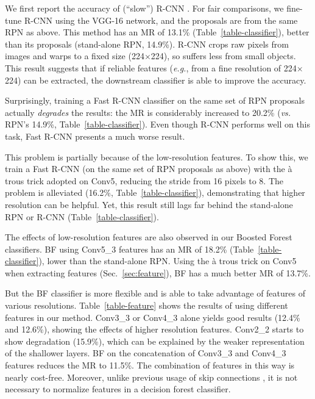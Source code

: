 \documentclass[runningheads]{llncs}
\def\eg{\emph{e.g.}}
\def\vs{\emph{vs. }}
\begin{document}
We first report the accuracy of (``slow'') R-CNN \cite{girshick2014rich}. For fair comparisons, we fine-tune R-CNN using the VGG-16 network, and the proposals are from the same RPN as above. This method has an MR of 13.1\% (Table~\ref{table-classifier}), better than its proposals (stand-alone RPN, 14.9\%). R-CNN crops raw pixels from images and warps to a fixed size (224$\times$224), so suffers less from small objects.
This result suggests that if reliable features (\eg, from a fine resolution of 224$\times$224) can be extracted, the downstream classifier is able to improve the accuracy. 

Surprisingly, training a Fast R-CNN classifier on the same set of RPN proposals actually \textit{degrades} the results: the MR is considerably increased to 20.2\% (\vs RPN's 14.9\%, Table~\ref{table-classifier}). Even though R-CNN performs well on this task, Fast R-CNN presents a much worse result.

This problem is partially because of the low-resolution features. To show this, we train a Fast R-CNN (on the same set of RPN proposals as above) with the \`a trous trick adopted on Conv5, reducing the stride from 16 pixels to 8. The problem is alleviated (16.2\%, Table~\ref{table-classifier}), demonstrating that higher resolution can be helpful. Yet, this result still lags far behind the stand-alone RPN or R-CNN (Table~\ref{table-classifier}).

The effects of low-resolution features are also observed in our Boosted Forest classifiers. BF using Conv5\_3 features has an MR of 18.2\% (Table~\ref{table-classifier}), lower than the stand-alone RPN. Using the \`a trous trick on Conv5 when extracting features (Sec.~\ref{sec:feature}), BF has a much better MR of 13.7\%.

But the BF classifier is more flexible and is able to take advantage of features of various resolutions. Table~\ref{table-feature} shows the results of using different features in our method.
Conv3\_3 or Conv4\_3 alone yields good results (12.4\% and 12.6\%), showing the effects of higher resolution features. Conv2\_2 starts to show degradation (15.9\%), which can be explained by the weaker representation of the shallower layers. 
BF on the concatenation of Conv3\_3 and Conv4\_3 features reduces the MR to 11.5\%. The combination of features in this way is nearly cost-free. Moreover, unlike previous usage of skip connections \cite{liu2015parsenet}, it is not necessary to normalize features in a decision forest classifier. 
\end{document}
